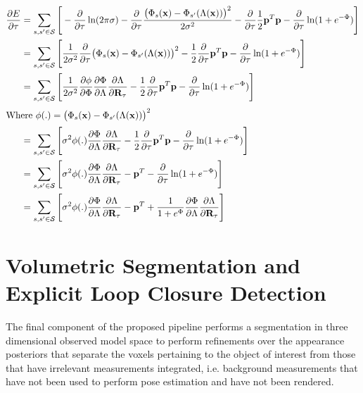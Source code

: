 \begin{align}
  \label{eqn:probobj_log_post_rot_grad}
  \frac{\partial E}{\partial \tau} &=
  \sum_{s, s' \in \mathcal{S}} \Bigg[ - \frac{\partial}{\partial \tau}
  \ln(2\pi\sigma) - \frac{\partial}{\partial \tau}
  \frac{\big(\Phi_{s}(\mathbf{x}) -
  \Phi_{s'}(\Lambda(\mathbf{x}))\big)^{2}}{2\sigma^{2}} -
  \frac{\partial}{\partial \tau} \frac{1}{2} \mathbf{p}^{T}\mathbf{p} -
  \frac{\partial}{\partial \tau} \ln(1 + e^{-\Phi})
  \Bigg]\\
  &= \sum_{s, s' \in \mathcal{S}} \Bigg[ \frac{1}{2\sigma^{2}}
  \frac{\partial}{\partial \tau}
  \big(\Phi_{s}(\mathbf{x}) - \Phi_{s'}(\Lambda(\mathbf{x}))\big)^{2} -
  \frac{1}{2} \frac{\partial}{\partial \tau}
  \mathbf{p}^{T}\mathbf{p} - \frac{\partial}{\partial \tau} \ln(1 + e^{-\Phi})
  \Bigg]\\
  &= \sum_{s, s' \in \mathcal{S}} \Bigg[ \frac{1}{2\sigma^{2}}
  \frac{\partial \phi}{\partial \Phi} \frac{\partial \Phi}{\partial \Lambda}
  \frac{\partial \Lambda}{\partial \mathbf{R}_{\tau}} -
  \frac{1}{2} \frac{\partial}{\partial \tau}
  \mathbf{p}^{T}\mathbf{p} - \frac{\partial}{\partial \tau} \ln(1 + e^{-\Phi})
  \Bigg]\\
  \shortintertext{Where $\phi(.) =
  \big(\Phi_{s}(\mathbf{x}) - \Phi_{s'}(\Lambda(\mathbf{x}))\big)^{2}$}
  &= \sum_{s, s' \in \mathcal{S}} \Bigg[ \sigma^{2} \phi(.)
  \frac{\partial \Phi}{\partial \Lambda}
  \frac{\partial \Lambda}{\partial \mathbf{R}_{\tau}} -
  \frac{1}{2} \frac{\partial}{\partial \tau}
  \mathbf{p}^{T}\mathbf{p} - \frac{\partial}{\partial \tau} \ln(1 + e^{-\Phi})
  \Bigg]\\
  &= \sum_{s, s' \in \mathcal{S}} \Bigg[ \sigma^{2} \phi(.)
  \frac{\partial \Phi}{\partial \Lambda}
  \frac{\partial \Lambda}{\partial \mathbf{R}_{\tau}} - \mathbf{p}^{T} -
  \frac{\partial}{\partial \tau} \ln(1 + e^{-\Phi})
    \Bigg]\\
  &= \sum_{s, s' \in \mathcal{S}} \Bigg[ \sigma^{2} \phi(.)
  \frac{\partial \Phi}{\partial \Lambda}
  \frac{\partial \Lambda}{\partial \mathbf{R}_{\tau}} - \mathbf{p}^{T} +
  \frac{1}{1 + e^{\Phi}} \frac{\partial \Phi}{\partial \Lambda}
  \frac{\partial \Lambda}{\partial \mathbf{R}_{\tau}} \Bigg]
\end{align}

\section{Volumetric Segmentation and Explicit Loop Closure Detection}
The final component of the proposed pipeline performs a segmentation in three
dimensional observed model space to perform refinements over the appearance
posteriors that separate the voxels pertaining to the object of interest from
those that have irrelevant measurements integrated, i.e. background measurements
that have not been used to perform pose estimation and have not been rendered.

